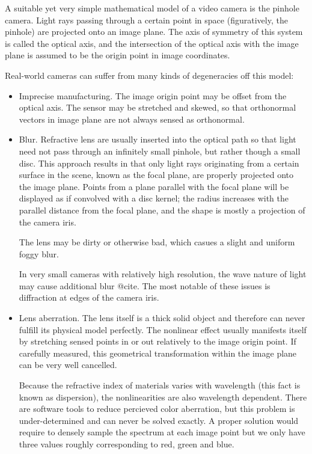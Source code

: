 A suitable yet very simple mathematical model of a video camera is the pinhole camera.
Light rays passing through a certain point in space (figuratively, the pinhole) are projected onto an image plane.
The axis of symmetry of this system is called the optical axis, and the intersection of the optical axis with the image plane is assumed to be the origin point in image coordinates.

Real-world cameras can suffer from many kinds of degeneracies off this model:
\begin{itemize}

\item
Imprecise manufacturing.
The image origin point may be offset from the optical axis.
The sensor may be stretched and skewed, so that orthonormal vectors in image plane are not always sensed as orthonormal.

\item
Blur.
Refractive lens are usually inserted into the optical path so that light need not pass through an infinitely small pinhole, but rather though a small disc.
This approach results in that only light rays originating from a certain surface in the scene, known as the focal plane, are properly projected onto the image plane.
Points from a plane parallel with the focal plane will be displayed as if convolved with a disc kernel; the radius increases with the parallel distance from the focal plane, and the shape is mostly a projection of the camera iris.

The lens may be dirty or otherwise bad, which casues a slight and uniform foggy blur.

In very small cameras with relatively high resolution, the wave nature of light may cause additional blur @cite.
The most notable of these issues is diffraction at edges of the camera iris.

\item
Lens aberration.
The lens itself is a thick solid object and therefore can never fulfill its physical model perfectly.
The nonlinear effect usually manifests itself by stretching sensed points in or out relatively to the image origin point.
If carefully measured, this geometrical transformation within the image plane can be very well cancelled.

Because the refractive index of materials varies with wavelength (this fact is known as dispersion), the nonlinearities are also wavelength dependent.
There are software tools to reduce percieved color aberration, but this problem is under-determined and can never be solved exactly.
A proper solution would require to densely sample the spectrum at each image point but we only have three values roughly corresponding to red, green and blue.


\end{itemize}
